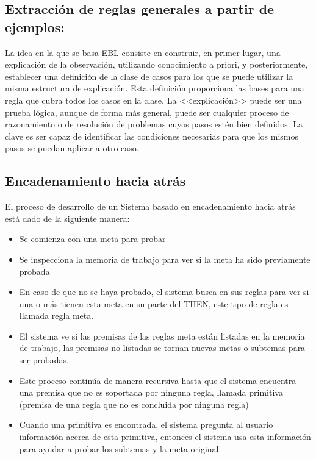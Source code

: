 \documentclass[12 pt, a4paper]{article}
\begin{document}
	 		\subsection{Extracción de reglas generales a partir de ejemplos:}
			La idea en la que se basa EBL consiste en construir, en primer lugar, una explicación de la observación, utilizando conocimiento a priori, y posteriormente, establecer una definición de la clase de casos para los que se puede utilizar la misma estructura de explicación. Esta definición proporciona las bases para una regla que cubra todos los casos en la clase. La <<explicación>> puede ser una prueba lógica, aunque de forma más general, puede ser cualquier proceso de razonamiento o de resolución de problemas cuyos pasos estén bien definidos. La clave es ser capaz de identificar las condiciones necesarias para que los mismos pasos se puedan aplicar a otro caso.
			
			\subsection{Encadenamiento hacia atrás}
			El proceso de desarrollo de un Sistema basado en encadenamiento hacia atrás está dado de la siguiente manera:

			\begin{itemize}
				\item Se comienza con una meta para probar\\
				\item Se inspecciona la memoria de trabajo para ver si la meta ha sido     previamente probada\\
				\item En caso de que no se haya probado, el sistema busca en sus reglas para ver si     una o más tienen esta meta en su parte del THEN, este tipo de regla     es llamada regla meta.\\
				\item El sistema ve si las premisas de las reglas meta están listadas en la memoria     de trabajo, las premisas no listadas se tornan nuevas metas o     subtemas para ser probadas.\\
				\item Este proceso continúa de manera recursiva hasta que el sistema encuentra una     premisa que no es soportada por ninguna regla, llamada primitiva     (premisa de una regla que no es concluida por ninguna regla)\\
				\item Cuando una primitiva es encontrada, el sistema pregunta al usuario información     acerca de esta primitiva, entonces el sistema usa esta información     para ayudar a probar los subtemas y la meta original\\
			\end{itemize}	
			
\end{document}

